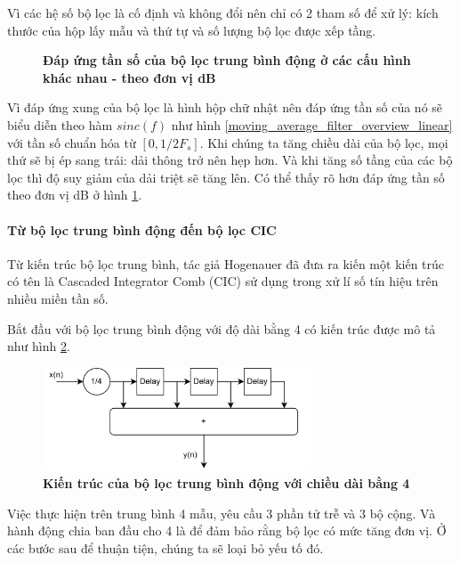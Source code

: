 Vì các hệ số bộ lọc là cố định và không đổi nên chỉ có 2 tham số để xử lý: kích thước của hộp lấy mẫu và thứ tự và số lượng bộ lọc được xếp tầng.
\begin{figure}[H]
    \centering
    
    \caption[Đáp ứng tần số của bộ lọc trung bình động ở các cấu hình khác nhau - theo đơn vị dB]{\bfseries \fontsize{12pt}{0pt}\selectfont Đáp ứng tần số của bộ lọc trung bình động ở các cấu hình khác nhau - theo đơn vị dB}
    \label{moving_average_filter_overview}
\end{figure}
Vì đáp ứng xung của bộ lọc là hình hộp chữ nhật nên đáp ứng tần số của nó sẽ biểu diễn theo hàm $sinc(f)$ như hình \ref{moving_average_filter_overview_linear} với tần số chuẩn hóa từ $[0, 1/2 F_s]$. Khi chúng ta tăng chiều dài của bộ lọc, mọi thứ sẽ bị ép sang trái: dải thông trở nên hẹp hơn. Và khi tăng số tầng của các bộ lọc thì độ suy giảm của dải triệt sẽ tăng lên. Có thể thấy rõ hơn đáp ứng tần số theo đơn vị dB ở hình \ref{moving_average_filter_overview}.

\paragraph{Từ bộ lọc trung bình động đến bộ lọc CIC}
Từ kiến trúc bộ lọc trung bình, tác giả Hogenauer đã đưa ra kiến một kiến trúc có tên là Cascaded Integrator Comb (CIC) sử dụng trong xử lí số tín hiệu trên nhiều miền tần số\cite{CIC}.

Bắt đầu với bộ lọc trung bình động với độ dài bằng 4 có kiến trúc được mô tả như hình \ref{cic_1}.
\begin{figure}[H]
    \centering
    \includegraphics[width=8cm]{Images/Chuong2/cic/cic_1.png}
    \caption[Kiến trúc của bộ lọc trung bình động với chiều dài bằng 4]{\bfseries \fontsize{12pt}{0pt}\selectfont Kiến trúc của bộ lọc trung bình động với chiều dài bằng 4}
    \label{cic_1}
\end{figure}

Việc thực hiện trên trung bình 4 mẫu, yêu cầu 3 phần tử trễ và 3 bộ cộng. Và hành động chia ban đầu cho 4 là để đảm bảo rằng bộ lọc có mức tăng đơn vị. Ở các bước sau để thuận tiện, chúng ta sẽ loại bỏ yếu tố đó.

